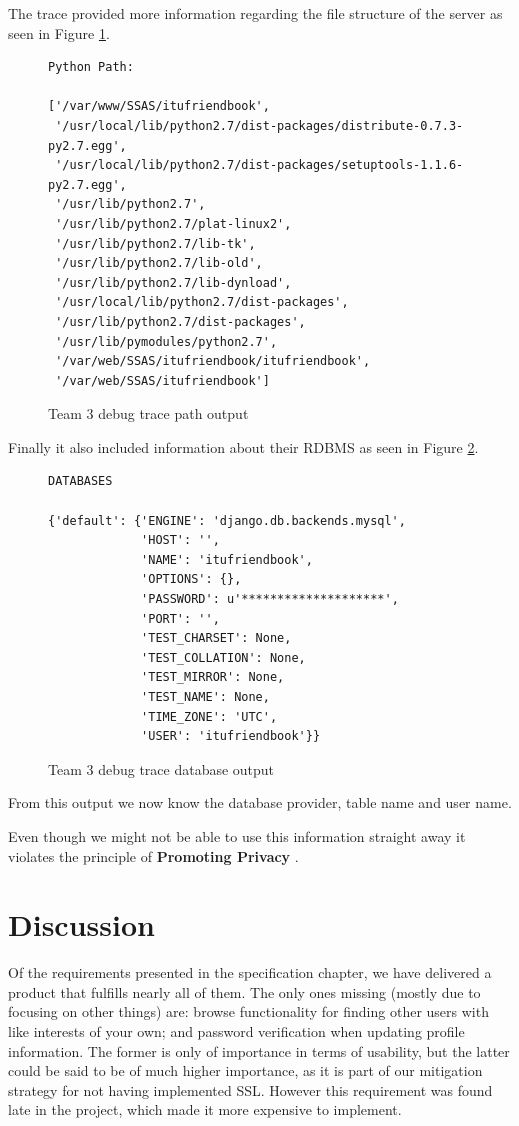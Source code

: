 \documentclass[a4paper]{article}
\begin{document}
The trace provided more information regarding the file structure of the server as seen in Figure \ref{fig:team_three_python}.
\begin{figure}[h!]
\caption{Team 3 debug trace path output}
\label{fig:team_three_python}
\begin{verbatim}
Python Path: 	

['/var/www/SSAS/itufriendbook',
 '/usr/local/lib/python2.7/dist-packages/distribute-0.7.3-py2.7.egg',
 '/usr/local/lib/python2.7/dist-packages/setuptools-1.1.6-py2.7.egg',
 '/usr/lib/python2.7',
 '/usr/lib/python2.7/plat-linux2',
 '/usr/lib/python2.7/lib-tk',
 '/usr/lib/python2.7/lib-old',
 '/usr/lib/python2.7/lib-dynload',
 '/usr/local/lib/python2.7/dist-packages',
 '/usr/lib/python2.7/dist-packages',
 '/usr/lib/pymodules/python2.7',
 '/var/web/SSAS/itufriendbook/itufriendbook',
 '/var/web/SSAS/itufriendbook']
\end{verbatim}
\end{figure}

Finally it also included information about their RDBMS as seen in Figure \ref{fig:team_three_db}.
\begin{figure}[h!]
\caption{Team 3 debug trace database output}
\label{fig:team_three_db}
\begin{verbatim}
DATABASES 	

{'default': {'ENGINE': 'django.db.backends.mysql',
             'HOST': '',
             'NAME': 'itufriendbook',
             'OPTIONS': {},
             'PASSWORD': u'********************',
             'PORT': '',
             'TEST_CHARSET': None,
             'TEST_COLLATION': None,
             'TEST_MIRROR': None,
             'TEST_NAME': None,
             'TIME_ZONE': 'UTC',
             'USER': 'itufriendbook'}}
\end{verbatim}
\end{figure}

From this output we now know the database provider, table name and user name. 

Even though we might not be able to use this information straight away it violates the principle of \textbf{Promoting Privacy} \cite{princ}.

\section{Discussion}\label{sec:discussion}
Of the requirements presented in the specification chapter, we have delivered a product that fulfills nearly all of them. The only ones missing (mostly due to focusing on other things) are: browse functionality for finding other users with like interests of your own; and password verification when updating profile information. The former is only of importance in terms of usability, but the latter could be said to be of much higher importance, as it is part of our mitigation strategy for not having implemented SSL. However this requirement was found late in the project, which made it more expensive to implement.
\end{document}

